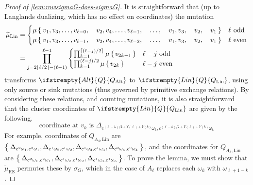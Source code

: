 \documentclass{amsart}
\theoremstyle{plain}
\theoremstyle{definition}
\theoremstyle{remark}
\newcommand{\fundamentalweight}{\omega}
\newcommand{\genminoryz}[3]{\Delta_{{#1} \fundamentalweight_{#3}, {#2}%
    \fundamentalweight_{#3}}}
\newcommand{\Q}[1]{\ifstrempty{#1}{Q}{Q_{\text{#1}}}}
\newcommand{\muint}[1]{\widetilde{\mu}_{\text{#1}}}
\newcommand{\murowperm}{\muint{RS}}
\begin{document}
\begin{proof}[Proof of \cref{lem:rowsigmaG-does-sigmaG}]
    It is straightforward that (up to Langlands dualizing, which has no
    effect on coordinates) the mutation
    \begin{equation*}
      \begin{aligned}
        \muint{Lin} &= \begin{cases}\mu\Set{v_1, v_3, \dotsc, v_{\ell - 0}, \quad v_2, v_4, \dotsc, v_{\ell - 1}, \quad \dotsc, \quad v_1, v_3, \quad v_2, \quad v_1} & \text{$\ell$ odd} \\ \mu\Set{v_1, v_3, \dotsc, v_{\ell - 1}, \quad v_2, v_4, \dotsc, v_{\ell - 2}, \quad \dotsc, \quad v_1, v_3, \quad v_2, \quad v_1} & \text{$\ell$ even} \end{cases} \\
        &= \prod_{j= 2 \lfloor \ell / 2 \rfloor - (\ell - 1)}^{\ell - 1} \begin{cases} \prod_{k=1}^{\lceil (\ell - j) / 2 \rceil} \mu\set{v_{2k - 1}} & \text{$\ell - j$ odd} \\ \prod_{k=1}^{(\ell - j) / 2} \mu\set{v_{2k}} & \text{$\ell - j$ even} \end{cases}
      \end{aligned}
    \end{equation*}
    transforms $\Q{Alt}$ to $\Q{Lin}$, using only source or sink
    mutations (thus governed by primitive exchange relations). By
    considering these relations, and counting mutations, it is also
    straightforward that the cluster coordinates of $\Q{Lin}$ are given
    by the following.
    \begin{equation*}
      \text{coordinate at $v_k$ is $\genminoryz{c^{(\ell - k)/2 +
            Y(\ell) + Y(k)}}{c^{(\ell - k)/2 + Y(\ell) + Y(k)}}{k}$}
    \end{equation*}
    For example, coordinates of $Q_{A_4,\text{Lin}}$ are
    $\Set{\genminoryz{c^2}{c^2}{1}, \genminoryz{c^1}{c^1}{2},
      \genminoryz{c^1}{c^1}{3}, \genminoryz{c^0}{c^0}{4}}$, and the
    coordinates for $Q_{A_3,\text{Lin}}$ are
    $\Set{\genminoryz{c^2}{c^2}{1}, \genminoryz{c^1}{c^1}{2},
      \genminoryz{c^1}{c^1}{3}}$. To prove the lemma, we must show that
    $\murowperm$ permutes these by $\sigma_G$, which in the case of
    $A_{\ell}$ replaces each $\fundamentalweight_k$ with
    $\fundamentalweight_{\ell + 1 - k}$.


\end{proof}
\end{document}
